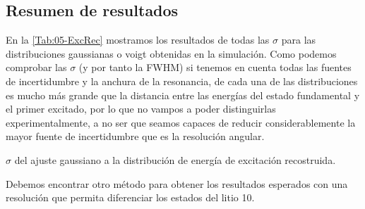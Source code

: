 \subsection{Resumen de resultados}

En la \cref{Tab:05-ExcRec} mostramos los resultados de todas las $\sigma$ para las distribuciones gaussianas o voigt obtenidas en la simulación. Como podemos comprobar las $\sigma$ (y por tanto la FWHM)  si tenemos en cuenta todas las fuentes de incertidumbre y la anchura de la resonancia, de cada una de las distribuciones es mucho más grande que la distancia entre las energías del estado fundamental y el primer excitado, por lo que no vampos a poder distinguirlas experimentalmente, a no ser que seamos capaces de reducir considerablemente la mayor fuente de incertidumbre que es la resolución angular. 

\begin{table}[H] \centering 

\caption{$\sigma$ del ajuste gaussiano a la distribución de energía de excitación recostruida.}
\label{Tab:05-ExcRec}
\end{table}

Debemos encontrar otro método para obtener los resultados esperados con una resolución que permita diferenciar los estados del litio 10.
